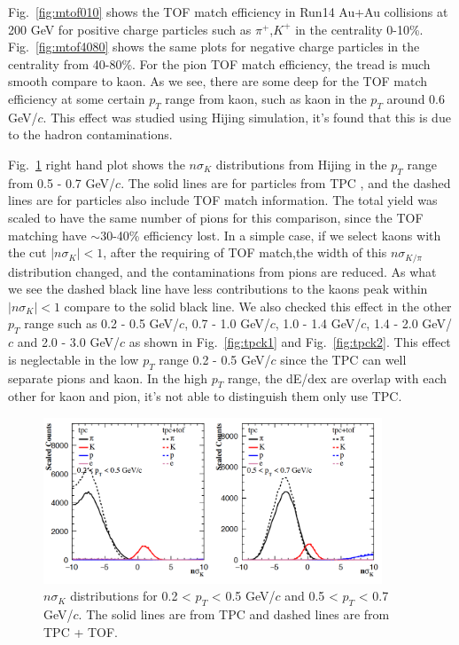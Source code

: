 Fig.~\ref{fig:mtof010} shows the TOF match efficiency in Run14 Au+Au collisions at 200 GeV for positive charge particles such as $\pi^{+}$,$K^{+}$ in the centrality 0-10\%. Fig.~\ref{fig:mtof4080} shows the same plots for negative charge particles in the centrality from 40-80\%. For the pion TOF match efficiency, the tread is much smooth compare to kaon. As we see, there are some deep for the TOF match efficiency at some certain $p_{T}$ range from kaon, such as kaon in the $p_{T}$ around 0.6 GeV/$c$. This effect was studied using Hijing simulation, it's found that this is due to the hadron contaminations. 

Fig.~\ref{fig:tpck0} right hand plot shows the $n\sigma_{K}$ distributions from Hijing in the $p_{T}$ range from 0.5 - 0.7 GeV/$c$. The solid lines are for particles from TPC , and the dashed lines are for particles also include TOF match information. The total yield was scaled to have the same number of pions for this comparison, since the TOF matching have $\sim$30-40\% efficiency lost. In a simple case, if we select kaons with the cut $|n\sigma_{K}| < 1 $, after the requiring of TOF match,the width of this $n\sigma_{K/\pi}$ distribution changed, and the contaminations from pions are reduced. As what we see the dashed black line have less contributions to the kaons peak within $|n\sigma_{K}| < 1$ compare to the solid black line. We also checked this effect in the other $p_{T}$ range such as 0.2 - 0.5 GeV/$c$, 0.7 - 1.0 GeV/$c$, 1.0 - 1.4 GeV/$c$, 1.4 - 2.0 GeV/$c$ and 2.0 - 3.0 GeV/$c$ as shown in Fig.~\ref{fig:tpck1} and Fig.~\ref{fig:tpck2}. This effect is neglectable in the low $p_{T}$ range 0.2 - 0.5 GeV/$c$ since the TPC can well separate pions and kaon. In the high $p_{T}$ range, the dE/dex are overlap with each other for kaon and pion, it's not able to distinguish them only use TPC.

\begin{figure}[htbp]
\centering
\includegraphics[keepaspectratio,width=0.9\textwidth,angle=-0]{figure/Run14_D0HFT/tofMatch_Hijing_nSigmaK_new_0.png}
\caption{$n\sigma_{K}$ distributions for 0.2 < $p_T$ < 0.5 GeV/$c$ and 0.5 < $p_T$ < 0.7 GeV/$c$. The solid lines are from TPC and dashed lines are from TPC + TOF.}
\label{fig:tpck0}
\end{figure}

